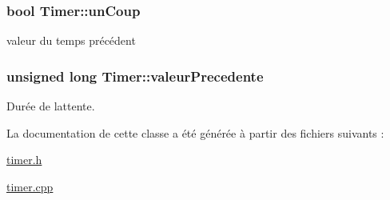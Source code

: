 \subsubsection[{\texorpdfstring{un\+Coup}{unCoup}}]{\setlength{\rightskip}{0pt plus 5cm}bool Timer\+::un\+Coup\hspace{0.3cm}{\ttfamily [private]}}\hypertarget{class_timer_a992bb5566966aba6e82a7f4ebfa90c4f}{}\label{class_timer_a992bb5566966aba6e82a7f4ebfa90c4f}


valeur du temps précédent 

\subsubsection[{\texorpdfstring{valeur\+Precedente}{valeurPrecedente}}]{\setlength{\rightskip}{0pt plus 5cm}unsigned long Timer\+::valeur\+Precedente\hspace{0.3cm}{\ttfamily [private]}}\hypertarget{class_timer_aefa4811f3619dc170520bc43c86c36f6}{}\label{class_timer_aefa4811f3619dc170520bc43c86c36f6}


Durée de l\textquotesingle{}attente. 



La documentation de cette classe a été générée à partir des fichiers suivants \+:\begin{DoxyCompactItemize}
\item 
\hyperlink{timer_8h}{timer.\+h}\item 
\hyperlink{timer_8cpp}{timer.\+cpp}\end{DoxyCompactItemize}

